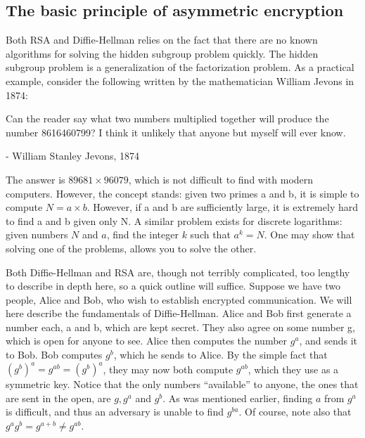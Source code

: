 \documentclass[conference]{IEEEtran}
\begin{document}
\subsection{The basic principle of asymmetric encryption}
Both RSA and Diffie-Hellman relies on the fact that there are no known algorithms for solving the hidden subgroup problem quickly.
The hidden subgroup problem is a generalization of the factorization problem.
As a practical example, consider the following written by the mathematician William Jevons in 1874:
\begin{quoting}
Can the reader say what two numbers multiplied together will produce the number 8616460799? I think it unlikely that anyone but myself will ever know.
 
- William Stanley Jevons, 1874
\end{quoting}
The answer is $89681 \times 96079$, which is not difficult to find with modern computers.
However, the concept stands: given two primes a and b, it is simple to compute $N = a \times b$.
However, if a and b are sufficiently large, it is extremely hard to find a and b given only N.
A similar problem exists for discrete logarithms: given numbers $N$ and $a$, find the integer $k$ such that $a^k = N$.
One may show that solving one of the problems, allows you to solve the other.

Both Diffie-Hellman and RSA are, though not terribly complicated, too lengthy to describe in depth here, so a quick outline will suffice.
Suppose we have two people, Alice and Bob, who wish to establish encrypted communication.
We will here describe the fundamentals of Diffie-Hellman.
Alice and Bob first generate a number each, a and b, which are kept secret.
They also agree on some number g, which is open for anyone to see.
Alice then computes the number $g^a$, and sends it to Bob.
Bob computes $g^b$, which he sends to Alice.
By the simple fact that $(g^b)^a = g^{ab} = (g^b)^a$, they may now both compute $g^{ab}$, which they use as a symmetric key.
Notice that the only numbers ``available'' to anyone, the ones that are sent in the open, are $g, g^a$ and $g^b$.
As was mentioned earlier, finding $a$ from $g^a$ is difficult, and thus an adversary is unable to find $g^{ba}$.
Of course, note also that $g^a g^b = g^{a+b}\neq g^{ab}$.

\end{document}

